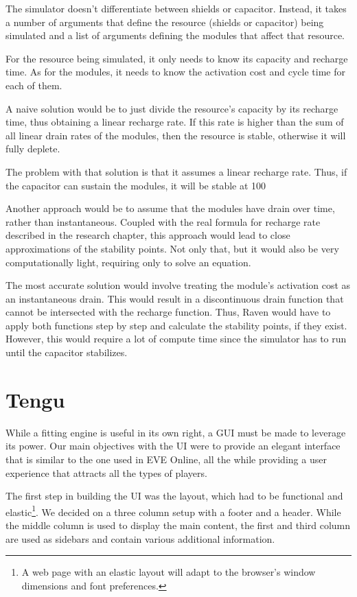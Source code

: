 The simulator doesn’t differentiate between shields or capacitor. Instead, it takes a number of arguments that define the resource (shields or capacitor) being simulated and a list of arguments defining the modules that affect that resource.

For the resource being simulated, it only needs to know its capacity and recharge time. As for the modules, it needs to know the activation cost and cycle time for each of them.

A naive solution would be to just divide the resource’s capacity by its recharge time, thus obtaining a linear recharge rate. If this rate is higher than the sum of all linear drain rates of the modules, then the resource is stable, otherwise it will fully deplete.

The problem with that solution is that it assumes a linear recharge rate. Thus, if the capacitor can sustain the modules, it will be stable at 100%

Another approach would be to assume that the modules have drain over time, rather than instantaneous. Coupled with the real formula for recharge rate described in the research chapter, this approach would lead to close approximations of the stability points. Not only that, but it would also be very computationally light, requiring only to solve an equation. 

The most accurate solution would involve treating the module’s activation cost as an instantaneous drain. This would result in a discontinuous drain function that cannot be intersected with the recharge function. Thus, Raven would have to apply both functions step by step and calculate the stability points, if they exist. However, this would require a lot of compute time since the simulator has to run until the capacitor stabilizes.

\section{Tengu}
While a fitting engine is useful in its own right, a GUI must be made to leverage its power. Our main objectives with the UI were to provide an elegant interface that is similar to the one used in EVE Online, all the while providing a user experience that attracts all the types of players.

The first step in building the UI was the layout, which had to be functional and elastic\footnote{A web page with an elastic layout will adapt to the browser’s window dimensions and font preferences.}. We decided on a three column setup with a footer and a header. While the middle column is used to display the main content, the first and third column are used as sidebars and contain various additional information.

